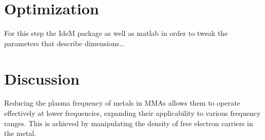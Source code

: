 \section{\textsf{Optimization}}
    For this step the IdeM package as well as matlab in order to tweak the parameters that
    describe dimensions\dots

\section{\textsf{Discussion}}
    Reducing the plasma frequency of metals in MMAs allows them to operate effectively at 
    lower frequencies, expanding their applicability to various frequency ranges. 
    This is achieved by manipulating the density of free electron carriers in the metal.